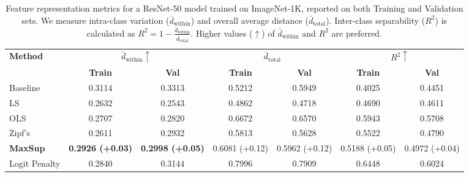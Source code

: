 \begin{table*}[ht]
\setlength{\tabcolsep}{6pt}
\renewcommand{\arraystretch}{1.2}
\centering
\scriptsize
\caption{
Feature representation metrics for a ResNet-50 model trained on ImageNet-1K, reported on both Training and Validation sets. 
We measure intra-class variation ($\bar{d}_\text{within}$) and overall average distance ($\bar{d}_\text{total}$). 
Inter-class separability ($R^2$) is calculated as 
\(R^2 = 1 - \frac{\bar{d}_\text{within}}{\bar{d}_\text{total}}\). 
Higher values (\(\uparrow\)) of \(\bar{d}_\text{within}\) and \(R^2\) are preferred. 
}
\label{tab:feature2}
\begin{tabular}{@{}l|cc|cc|cc@{}}
\toprule
\multirow{2}{*}{\textbf{Method}} 
& \multicolumn{2}{c|}{$\bar{d}_\text{within} \uparrow$} 
& \multicolumn{2}{c|}{$\bar{d}_\text{total}$} 
& \multicolumn{2}{c}{$R^2 \uparrow$} \\
\cmidrule{2-7}
& \textbf{Train} & \textbf{Val} & \textbf{Train} & \textbf{Val} & \textbf{Train} & \textbf{Val} \\
\midrule
Baseline 
& 0.3114 & 0.3313 & 0.5212 & 0.5949 & 0.4025 & 0.4451 \\
\hline
LS 
& 0.2632 & 0.2543 & 0.4862 & 0.4718 & 0.4690 & 0.4611 \\
OLS 
& 0.2707 & 0.2820 & 0.6672 & 0.6570 & 0.5943 & 0.5708 \\
Zipf’s 
& 0.2611 & 0.2932 & 0.5813 & 0.5628 & 0.5522 & 0.4790 \\
\textbf{MaxSup}
& \textbf{0.2926 (+0.03)} & \textbf{0.2998 (+0.05)} 
& 0.6081 (+0.12) & 0.5962 (+0.12) 
& 0.5188 (+0.05) & 0.4972 (+0.04) \\
Logit Penalty 
& 0.2840 & 0.3144 & 0.7996 & 0.7909 & 0.6448 & 0.6024 \\
\bottomrule
\end{tabular}
\end{table*}

